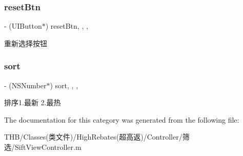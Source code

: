 \subsubsection{\texorpdfstring{reset\+Btn}{resetBtn}}
{\footnotesize\ttfamily -\/ (U\+I\+Button$\ast$) reset\+Btn\hspace{0.3cm}{\ttfamily [read]}, {\ttfamily [write]}, {\ttfamily [nonatomic]}, {\ttfamily [strong]}}

重新选择按钮 \mbox{\label{category_sift_view_controller_07_08_abe6bca432adb0dd6ea19b1196b1e7b70}} 
\subsubsection{\texorpdfstring{sort}{sort}}
{\footnotesize\ttfamily -\/ (N\+S\+Number$\ast$) sort\hspace{0.3cm}{\ttfamily [read]}, {\ttfamily [write]}, {\ttfamily [nonatomic]}, {\ttfamily [strong]}}

排序1.\+最新 2.最热 

The documentation for this category was generated from the following file\+:\begin{DoxyCompactItemize}
\item 
T\+H\+B/\+Classes(类文件)/\+High\+Rebates(超高返)/\+Controller/筛选/Sift\+View\+Controller.\+m\end{DoxyCompactItemize}
